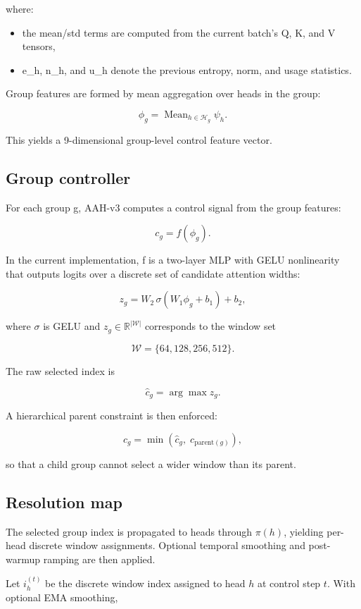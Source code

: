 \documentclass[11pt]{article}
\begin{document}
where:
\begin{itemize}
\item the mean/std terms are computed from the current batch’s Q, K, and V tensors,
\item e_h, n_h, and u_h denote the previous entropy, norm, and usage statistics.
\end{itemize}

Group features are formed by mean aggregation over heads in the group:

\[
\phi_g = \operatorname{Mean}_{h\in\mathcal H_g}\psi_h.
\]

This yields a 9-dimensional group-level control feature vector.

\subsection{Group controller}

For each group g, AAH-v3 computes a control signal from the group features:

\[
c_g = f(\phi_g).
\]

In the current implementation, f is a two-layer MLP with GELU nonlinearity that outputs logits over a discrete set of candidate attention widths:

\[
z_g = W_2\,\sigma(W_1\phi_g+b_1)+b_2,
\]

where $\sigma$ is GELU and $z_g \in \mathbb R^{|\mathcal W|}$ corresponds to the window set

\[
\mathcal W = \{64,128,256,512\}.
\]

The raw selected index is

\[
\hat c_g = \arg\max z_g.
\]

A hierarchical parent constraint is then enforced:

\[
c_g = \min(\hat c_g,\; c_{\mathrm{parent}(g)}),
\]

so that a child group cannot select a wider window than its parent.

\subsection{Resolution map}

The selected group index is propagated to heads through $\pi(h)$, yielding per-head discrete window assignments. Optional temporal smoothing and post-warmup ramping are then applied.

Let $i_h^{(t)}$ be the discrete window index assigned to head $h$ at control step $t$. With optional EMA smoothing,
\end{document}
